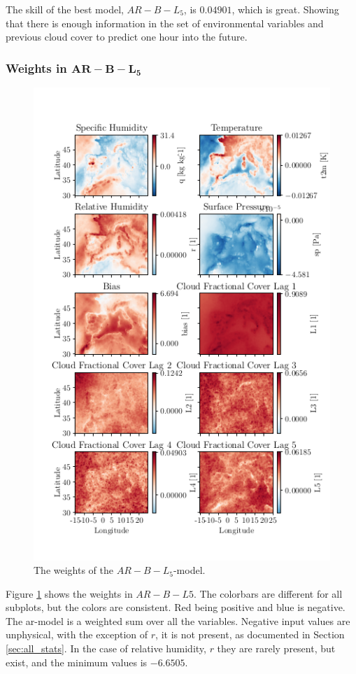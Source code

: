 The skill of the best model, $AR-B-L_5$, is $0.04901$, which is great.
Showing that there is enough information in the set of environmental variables and previous cloud cover to predict one hour into the future.
\subsubsection{Weights in $\mathbf{AR-B-L_5}$}
\begin{figure}
    \centering
    \includegraphics[scale=0.9]{python_figs/weights_AR-B-L5_best_ar_model.png}
    \caption{The weights of the $AR-B-L_5$-model.}
    \label{fig:weights_best_model}
\end{figure}
Figure \ref{fig:weights_best_model} shows the weights in $AR-B-L5$. The colorbars are different for all subplots, but the colors are consistent. Red being positive and blue is negative. The \acrshort{ar}-model is a weighted sum over all the variables. Negative input values are unphysical, with the exception of $r$, it is not present, as documented in Section \ref{sec:all_stats}. In the case of relative humidity, $r$ they are rarely present, but exist, and the minimum values is $-6.6505$. 

